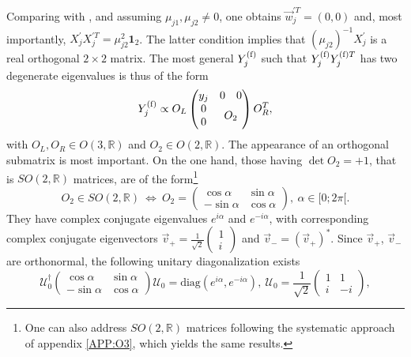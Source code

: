 \documentclass[12pt,a4paper]{article}
\begin{document}
Comparing  with , and assuming $\mu_{j1},\mu_{j2}\neq 0$, one obtains $\vec w_j^{\prime T}=(0, 0)$ and, most importantly, $X_j^\prime X_j^{\prime T}=\mu_{j2}^2\mathbf{1}_2$. The latter condition implies that $(\mu_{j2})^{-1}X_j^\prime$ is a real orthogonal $2\times 2$ matrix. The most general $Y_{j}^{\rm (f)}$ such that $Y_{j}^{\rm (f)}Y_{j}^{{\rm (f)}T}$ has two degenerate eigenvalues is thus of the form
\begin{equation}
Y_{j}^{\rm (f)}\propto O_L\begin{pmatrix}y_j & \begin{matrix}0&0\end{matrix}\\ \begin{matrix}0\\ 0\end{matrix} & O_2\end{pmatrix}O_R^{T},
\end{equation}
with $O_L,O_R\in O(3,\mathbb{R})$ and $O_2\in O(2,\mathbb{R})$. The appearance of an orthogonal submatrix is most important. On the one hand, those having $\det O_2=+1$, that is $SO(2,\mathbb{R})$ matrices, are of the form\footnote{One can also address $SO(2,\mathbb{R})$ matrices following the systematic approach of appendix \ref{APP:O3}, which yields the same results.}
\begin{equation}
 O_2\in SO(2,\mathbb{R})\ \Leftrightarrow\ O_2=\begin{pmatrix}\cos \alpha & \sin\alpha\\ -\sin\alpha&\cos\alpha\end{pmatrix},\ \alpha\in [0;2\pi[.
\end{equation}
They have complex conjugate eigenvalues $e^{i\alpha}$ and $e^{-i\alpha}$, with corresponding complex conjugate eigenvectors $\vec v_+=\frac{1}{\sqrt 2}\left(\begin{smallmatrix}1\\ i\end{smallmatrix}\right)$ and $\vec v_-=(\vec v_+)^\ast$. Since $\vec v_+$, $\vec v_-$ are orthonormal, the following unitary diagonalization exists
\begin{equation}\label{eq:SO2R:diag}
 \mathcal U_{0}^\dagger\begin{pmatrix}\cos \alpha & \sin\alpha\\ -\sin\alpha&\cos\alpha\end{pmatrix}\mathcal U_{0}=\text{diag}(e^{i\alpha},e^{-i\alpha}),\ \mathcal U_{0}=\frac{1}{\sqrt{2}}\begin{pmatrix}1 & 1\\ i& -i\end{pmatrix},
\end{equation}
\end{document}
